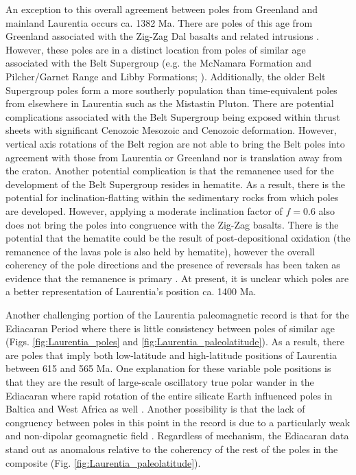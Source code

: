 \documentclass[11pt,letterpaper]{article}
\begin{document}
An exception to this overall agreement between poles from Greenland and mainland Laurentia occurs ca. 1382 Ma. There are poles of this age from Greenland associated with the Zig-Zag Dal basalts and related intrusions \citep{Marcussen1983a, Abrahamsen1987a}. However, these poles are in a distinct location from poles of similar age associated with the Belt Supergroup (e.g. the McNamara Formation and Pilcher/Garnet Range and Libby Formations; \citealp{Elston2002a}). Additionally, the older Belt Supergroup poles form a more southerly population than time-equivalent poles from elsewhere in Laurentia such as the Mistastin Pluton. There are potential complications associated with the Belt Supergroup being exposed within thrust sheets with significant Cenozoic Mesozoic and Cenozoic deformation. However, vertical axis rotations of the Belt region are not able to bring the Belt poles into agreement with those from Laurentia or Greenland nor is translation away from the craton. Another potential complication is that the remanence used for the development of the Belt Supergroup resides in hematite. As a result, there is the potential for inclination-flatting within the sedimentary rocks from which poles are developed. However, applying a moderate inclination factor of $f=0.6$ also does not bring the poles into congruence with the Zig-Zag basalts. There is the potential that the hematite could be the result of post-depositional oxidation (the remanence of the lavas pole is also held by hematite), however the overall coherency of the pole directions and the presence of reversals has been taken as evidence that the remanence is primary \citep{Elston2002a}. At present, it is unclear which poles are a better representation of Laurentia's position ca. 1400 Ma.

Another challenging portion of the Laurentia paleomagnetic record is that for the Ediacaran Period where there is little consistency between poles of similar age (Figs. \ref{fig:Laurentia_poles} and \ref{fig:Laurentia_paleolatitude}). As a result, there are poles that imply both low-latitude and high-latitude positions of Laurentia between 615 and 565 Ma. One explanation for these variable pole positions is that they are the result of large-scale oscillatory true polar wander in the Ediacaran where rapid rotation of the entire silicate Earth influenced poles in Baltica and West Africa as well \citep{McCausland2007a, Robert2017a}. Another possibility is that the lack of congruency between poles in this point in the record is due to a particularly weak and non-dipolar geomagnetic field \citep{Abrajevitch2010a, Halls2015a, Bono2019a}. Regardless of mechanism, the Ediacaran data stand out as anomalous relative to the coherency of the rest of the poles in the composite (Fig. \ref{fig:Laurentia_paleolatitude}).
\end{document}
